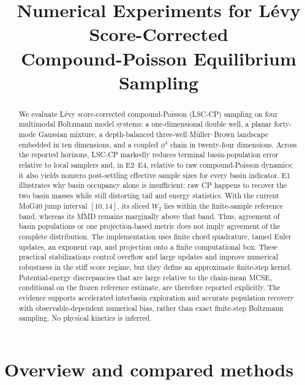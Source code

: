 \documentclass[11pt]{article}
\title{Numerical Experiments for L\'evy Score-Corrected\\
Compound-Poisson Equilibrium Sampling}
\author{}
\date{}
\begin{document}
\maketitle

\begin{abstract}
We evaluate L\'evy score-corrected compound-Poisson (LSC-CP) sampling on four
multimodal Boltzmann model systems: a one-dimensional double well, a planar
forty-mode Gaussian mixture, a depth-balanced three-well M\"uller--Brown
landscape embedded in ten dimensions, and a coupled $\phi^4$ chain in
twenty-four dimensions.  Across the reported horizons, LSC-CP markedly reduces
terminal basin-population error relative to local samplers and, in E2--E4,
relative to raw compound-Poisson dynamics; it also yields nonzero post-settling
effective sample sizes for every basin indicator.  E1 illustrates why basin
occupancy alone is insufficient: raw CP happens to recover the two basin
masses while still distorting tail and energy statistics.  With the current
MoG40 jump interval
$[10,14]$, its sliced $W_2$ lies within the finite-sample reference band,
whereas its MMD remains marginally above that band.  Thus, agreement of basin
populations or one projection-based metric does not imply agreement of the complete
distribution.
The implementation uses finite chord quadrature, tamed Euler updates, an
exponent cap, and projection onto a finite computational box.  These practical
stabilizations control overflow and large updates and improve numerical
robustness in the stiff score regime, but they define an approximate
finite-step kernel.  Potential-energy discrepancies that are large relative
to the chain-mean MCSE, conditional on the frozen reference estimate, are
therefore reported explicitly.  The evidence
supports accelerated interbasin exploration and accurate population recovery
with observable-dependent numerical bias, rather than exact finite-step
Boltzmann sampling.  No physical kinetics is inferred.
\end{abstract}

\section{Overview and compared methods}
\label{sec:overview}
\end{document}
